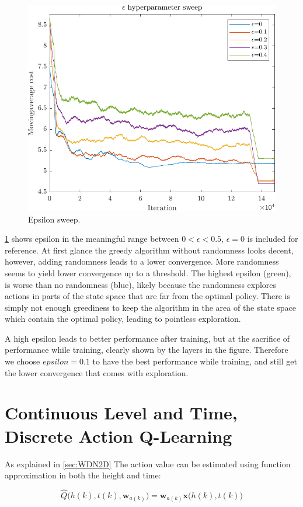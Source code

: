 \newpage
\clearpage
\begin{figure}[h!]
	\centering
	\includegraphics[width=0.7\linewidth]{figures/EpsilonSweepApprox.pdf}
	\caption{Epsilon sweep.}
	\label{fig:EpsilonSweep}
\end{figure} 

\cref{fig:EpsilonSweep} shows epsilon in the meaningful range between $0 < \epsilon < 0.5$, $\epsilon = 0$ is included for reference. At first glance the greedy algorithm without randomness looks decent, however, adding randomness leads to a lower convergence. More randomness seems to yield lower convergence up to a threshold. The highest epsilon (green), is worse than no randomness (blue), likely because the randomness explores actions in parts of the state space that are far from the optimal policy. There is simply not enough greediness to keep the algorithm in the area of the state space which contain the optimal policy, leading to pointless exploration.

A high epsilon leads to better performance after training, but at the sacrifice of performance while training, clearly shown by the layers in the figure. Therefore we choose $epsilon = 0.1$ to have the best performance while training, and still get the lower convergence that comes with exploration.
\fi


\clearpage
\newpage
\section{Continuous Level and Time, Discrete Action Q-Learning}


As explained in \cref{sec:WDN2D} The action value can be estimated using function approximation in both the height and time:

\begin{equation}
	\hat{Q}\bigg(h(k),t(k),\textbf{w}_{a(k)}\bigg) =  \textbf{w}_{a(k)}\textbf{x}\bigg(h(k),t(k)\bigg)
\end{equation}

